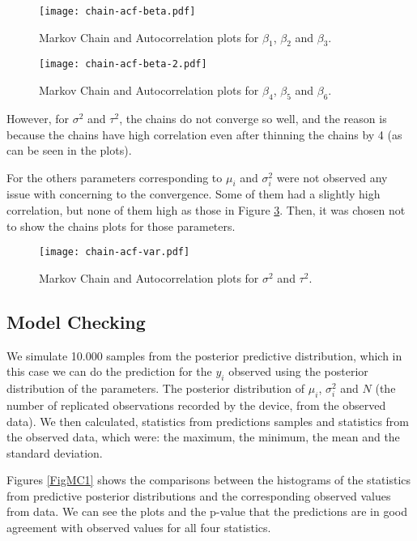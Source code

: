 \documentclass{asaproc}
\begin{document}
\begin{figure}[H]
\centering
\texttt{[image: chain-acf-beta.pdf]}
\caption{Markov Chain and Autocorrelation plots for $\beta_1$, $\beta_2$ and $\beta_3$.}
\label{FigMCACF1}
\end{figure}

\begin{figure}[H]
\centering
\texttt{[image: chain-acf-beta-2.pdf]}
\caption{Markov Chain and Autocorrelation plots for $\beta_4$, $\beta_5$ and $\beta_6$.}
\label{FigMCACF12}
\end{figure}

However, for $\sigma^2$ and $\tau^2$, the chains do not converge so well, and the reason is because the chains have high correlation even after thinning the chains by 4 (as can be seen in the plots).

For the others parameters corresponding to $\mu_i$ and $\sigma^2_i$ were not observed any issue with concerning to the convergence. Some of them had a slightly high correlation, but none of them high as those in Figure \ref{FigMCACF2}. Then, it was chosen not to show the chains plots for those parameters.


\begin{figure}[H]
\centering
\texttt{[image: chain-acf-var.pdf]}
\caption{Markov Chain and Autocorrelation plots for $\sigma^2$ and $\tau^2$.}
\label{FigMCACF2}
\end{figure}


\subsection{Model Checking}

We simulate 10.000 samples from the posterior predictive distribution, which in this case we can do the prediction for the $y_i$ observed using the posterior distribution of the parameters. The posterior distribution of $\mu_i$, $\sigma^2_i$ and $N$ (the number of replicated observations recorded by the device, from the observed data). We then calculated, statistics from predictions samples and statistics from the observed data, which were: the maximum, the minimum, the mean and the standard deviation.

Figures \ref{FigMC1} shows the comparisons between the histograms of the statistics from predictive posterior distributions and the corresponding observed values from data. We can see the plots and the p-value that the predictions are in good agreement with observed values for all four statistics.
\end{document}
